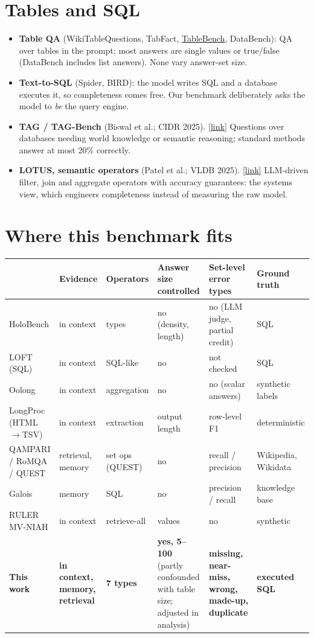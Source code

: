 \documentclass[10pt]{article}
\newcommand{\paper}[3]{\textbf{#1} \textnormal{(#2)}. \href{#3}{\small[link]}}
\begin{document}
\section*{Tables and SQL}
\begin{itemize}
\item \textbf{Table QA} (WikiTableQuestions, TabFact, \href{https://ojs.aaai.org/index.php/AAAI/article/view/34739}{TableBench},
DataBench): QA over tables in the prompt; most answers are single values or true/false (DataBench includes list
answers). None vary answer-set size.
\item \textbf{Text-to-SQL} (Spider, BIRD): the model writes SQL and a database executes it, so completeness comes
free. Our benchmark deliberately asks the model to \emph{be} the query engine.
\item \paper{TAG / TAG-Bench}{Biswal et al.; CIDR 2025}{https://arxiv.org/abs/2408.14717}
Questions over databases needing world knowledge or semantic reasoning; standard methods answer at most 20\%
correctly.
\item \paper{LOTUS, semantic operators}{Patel et al.; VLDB 2025}{https://arxiv.org/abs/2407.11418}
LLM-driven filter, join and aggregate operators with accuracy guarantees: the systems view, which engineers
completeness instead of measuring the raw model.
\end{itemize}

\section*{Where this benchmark fits}
{\small\setlength{\tabcolsep}{4pt}
\begin{tabularx}{\linewidth}{@{}>{\raggedright\arraybackslash}p{2.6cm}>{\raggedright\arraybackslash}X
>{\raggedright\arraybackslash}X>{\raggedright\arraybackslash}X>{\raggedright\arraybackslash}X
>{\raggedright\arraybackslash}p{2.0cm}@{}}
\toprule
 & Evidence & Operators & Answer size controlled & Set-level error types & Ground truth \\
\midrule
HoloBench & in context & 5 types & no (density, length) & no (LLM judge, partial credit) & SQL \\
LOFT (SQL) & in context & SQL-like & no & not checked & SQL \\
Oolong & in context & aggregation & no & no (scalar answers) & synthetic labels \\
LongProc (HTML$\to$TSV) & in context & extraction & output length & row-level F1 & deterministic \\
QAMPARI / RoMQA / QUEST & retrieval, memory & set ops (QUEST) & no & recall / precision & Wikipedia, Wikidata \\
Galois & memory & SQL & no & precision / recall & knowledge base \\
RULER MV-NIAH & in context & retrieve-all & 4 values & no & synthetic \\
\midrule
\textbf{This work} & \textbf{in context, memory, retrieval} & \textbf{7 types} & \textbf{yes, 5--100} (partly
confounded with table size; adjusted in analysis) & \textbf{missing, near-miss, wrong, made-up, duplicate} &
\textbf{executed SQL} \\
\bottomrule
\end{tabularx}}
\end{document}
